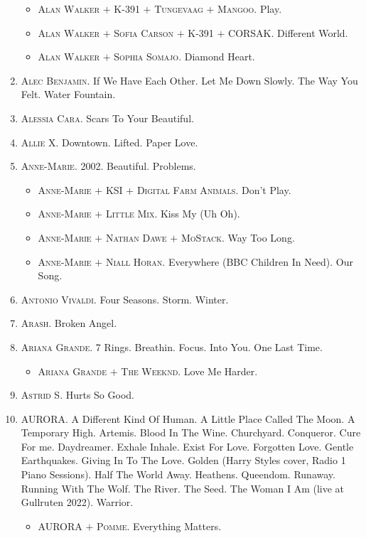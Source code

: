 \documentclass{article}
\numberwithin{equation}{section}
\begin{document}
\begin{enumerate}
\begin{itemize}
		\item \textsc{Alan Walker $+$ K-391 $+$ Tungevaag $+$ Mangoo.} Play.
		\item \textsc{Alan Walker $+$ Sofia Carson $+$ K-391 $+$ CORSAK.} Different World.
		\item \textsc{Alan Walker $+$ Sophia Somajo.} Diamond Heart.
	\end{itemize}
	\item \textsc{Alec Benjamin.} If We Have Each Other. Let Me Down Slowly. The Way You Felt. Water Fountain.
	\item \textsc{Alessia Cara.} Scars To Your Beautiful.
	\item \textsc{Allie X.} Downtown. Lifted. Paper Love.
	\item \textsc{Anne-Marie.} 2002. Beautiful. Problems.
	\begin{itemize}
		\item \textsc{Anne-Marie $+$ KSI $+$ Digital Farm Animals.} Don't Play.
		\item \textsc{Anne-Marie $+$ Little Mix.} Kiss My (Uh Oh).
		\item \textsc{Anne-Marie $+$ Nathan Dawe $+$ MoStack.} Way Too Long.
		\item \textsc{Anne-Marie $+$ Niall Horan.} Everywhere (BBC Children In Need). Our Song.
	\end{itemize}
	\item \textsc{Antonio Vivaldi.} Four Seasons. Storm. Winter.
	\item \textsc{Arash.} Broken Angel.
	\item \textsc{Ariana Grande.} 7 Rings. Breathin. Focus. Into You. One Last Time.
	\begin{itemize}
		\item \textsc{Ariana Grande $+$ The Weeknd.} Love Me Harder.
	\end{itemize}
	\item \textsc{Astrid S.} Hurts So Good.
	\item \textsc{AURORA.} A Different Kind Of Human. A Little Place Called The Moon. A Temporary High. Artemis. Blood In The Wine. Churchyard. Conqueror. Cure For me. Daydreamer. Exhale Inhale. Exist For Love. Forgotten Love. Gentle Earthquakes. Giving In To The Love. Golden (Harry Styles  cover, Radio 1 Piano Sessions). Half The World Away. Heathens. Queendom. Runaway. Running With The Wolf. The River. The Seed. The Woman I Am (live at Gullruten 2022). Warrior.
	\begin{itemize}
		\item \textsc{AURORA $+$ Pomme.} Everything Matters.

\end{itemize}
\end{enumerate}
\end{document}
